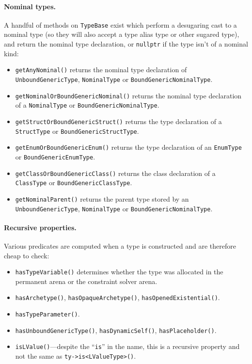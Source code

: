 \documentclass[../generics]{subfiles}
\begin{document}
\paragraph{Nominal types.} A handful of methods on \texttt{TypeBase} exist which perform a desugaring cast to a nominal type (so they will also accept a type alias type or other sugared type), and return the nominal type declaration, or \texttt{nullptr} if the type isn't of a nominal kind:
\begin{itemize}
\item \texttt{getAnyNominal()} returns the nominal type declaration of \texttt{UnboundGenericType}, \texttt{NominalType} or \texttt{BoundGenericNominalType}.
\item \texttt{getNominalOrBoundGenericNominal()} returns the nominal type declaration of a \texttt{NominalType} or \texttt{BoundGenericNominalType}.
\item \texttt{getStructOrBoundGenericStruct()} returns the type declaration of a \texttt{StructType} or \texttt{BoundGenericStructType}.
\item \texttt{getEnumOrBoundGenericEnum()} returns the type declaration of an \texttt{EnumType} or \texttt{BoundGenericEnumType}.
\item \texttt{getClassOrBoundGenericClass()} returns the class declaration of a \texttt{ClassType} or \texttt{BoundGenericClassType}.
\item \texttt{getNominalParent()} returns the parent type stored by an \texttt{UnboundGenericType}, \texttt{NominalType} or \texttt{BoundGenericNominalType}.
\end{itemize}

\paragraph{Recursive properties.} Various predicates are computed when a type is constructed and are therefore cheap to check:
\begin{itemize}
\item \texttt{hasTypeVariable()} determines whether the type was allocated in the permanent arena or the constraint solver arena.
\item \texttt{hasArchetype()}, \texttt{hasOpaqueArchetype()}, \texttt{hasOpenedExistential()}.
\item \texttt{hasTypeParameter()}.
\item \texttt{hasUnboundGenericType()}, \texttt{hasDynamicSelf()}, \texttt{hasPlaceholder()}.
\item \texttt{isLValue()}---despite the ``\texttt{is}'' in the name, this is a recursive property and not the same as \verb|ty->is<LValueType>()|.
\end{itemize}
\end{document}
